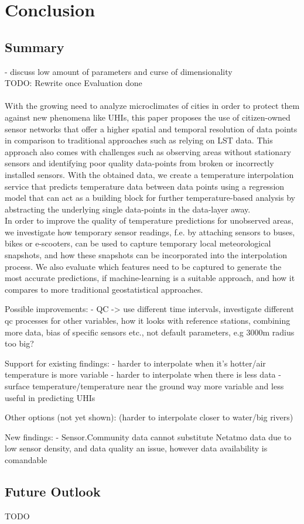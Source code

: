 \chapter{Conclusion}
\label{chap:Conclusion}

\section{Summary}

- discuss low amount of parameters and curse of dimensionality\\

TODO: Rewrite once Evaluation done\\
\\

With the growing need to analyze microclimates of cities in order to protect them against new phenomena like UHIs, this paper proposes the use of citizen-owned sensor networks that offer a higher spatial and temporal resolution of data points in comparison to traditional approaches such as relying on LST data. This approach also comes with challenges such as observing areas without stationary sensors and identifying poor quality data-points from broken or incorrectly installed sensors. With the obtained data, we create a temperature interpolation service that predicts temperature data between data points using a regression model that can act as a building block for further temperature-based analysis by abstracting the underlying single data-points in the data-layer away.\\
In order to improve the quality of temperature predictions for unobserved areas, we investigate how temporary sensor readings, f.e. by attaching sensors to buses, bikes or e-scooters, can be used to capture temporary local meteorological snapshots, and how these snapshots can be incorporated into the interpolation process. We also evaluate which features need to be captured to generate the most accurate predictions, if machine-learning is a suitable approach, and how it compares to more traditional geostatistical approaches.

Possible improvements:
- QC -> use different time intervals, investigate different qc processes for other variables, how it looks with reference stations, combining more data, bias of specific sensors etc., not default parameters, e.g 3000m radius too big?

Support for existing findings:
- harder to interpolate when it's hotter/air temperature is more variable
- harder to interpolate when there is less data
- surface temperature/temperature near the ground way more variable and less useful in predicting UHIs

Other options (not yet shown):
(harder to interpolate closer to water/big rivers)

New findings:
- Sensor.Community data cannot substitute Netatmo data due to low sensor density, and data quality an issue, however data availability is comandable


\section{Future Outlook}

TODO